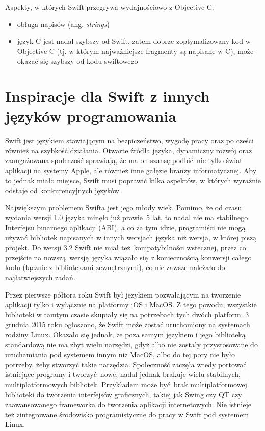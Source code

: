 \documentclass[mgr, shortabstract]{iithesis}
\newcommand{\ang}[1]{ang. \textit{#1}}
\begin{document}
Aspekty, w których Swift przegrywa wydajnościowo z Objective-C:
\begin{itemize}
    \item obługa napisów (\ang{strings})
    \item język C jest nadal szybszy od Swift, zatem dobrze zoptymalizowany kod w Objective-C (tj. w którym najważniejsze fragmenty są napisane w C), może okazać się szybszy od kodu swiftowego
\end{itemize}

\section{Inspiracje dla Swift z innych języków programowania}

Swift jest językiem stawiającym na bezpiczeństwo, wygodę pracy oraz po cześci również na szybkość działania. Otwarte źródła języka, dynamiczny rozwój oraz zaangażowana społeczość sprawiają, że ma on szansę podbić nie tylko świat aplikacji na systemy Apple, ale również inne gałęzie branży informatycznej. Aby to jednak miało miejsce, Swift musi poprawić kilka aspektów, w których wyraźnie odstaje od konkurencyjnych języków.

Największym problemem Swifta jest jego młody wiek. Pomimo, że od czasu wydania wersji 1.0 języka minęło już prawie 5 lat, to nadal nie ma stabilnego Interfejsu binarnego aplikacji (ABI), a co za tym idzie, programiści nie mogą używać bibliotek napisanych w innych wersjach języka niż wersja, w której piszą projekt. Do wersji 3.2 Swift nie miał też kompatybilności wstecznej, przez co przejście na nowszą wersję języka wiązało się z koniecznością konwersji całego kodu (łącznie z bibliotekami zewnętrznymi), co nie zawsze należało do najłatwiejszych zadań.

Przez pierwsze półtora roku Swift był językiem pozwalającym na tworzenie aplikacji tylko i wyłącznie na platformy iOS i MacOS. Z tego powodu, wszystkie biblioteki w tamtym czasie skupiały się na potrzebach tych dwóch platform. 3 grudnia 2015 roku ogłoszono, że Swift może zostać uruchomiony na systemach rodziny Linux. Okazało się jednak, że poza samym językiem i jego biblioteką standardową nie ma zbyt wielu narzędzi, gdyż albo nie zostały przystosowane do uruchamiania pod systemem innym niż MacOS, albo do tej pory nie było potrzeby, żeby stworzyć takie narzędzia. Społeczność zaczęła wtedy portować istniejące programy i tworzyć nowe, nadal jednak brakuje wielu stabilnych, multiplatformowych bibliotek. Przykładem może być brak multiplatformowej biblioteki do tworzenia interfejsów graficznych, takiej jak Swing czy QT czy zaawansowanego frameworka do tworzenia aplikacji internetowych. Nie istnieje też zintegrowane środowisko programistyczne do pracy w Swift pod systemem Linux.
\end{document}
